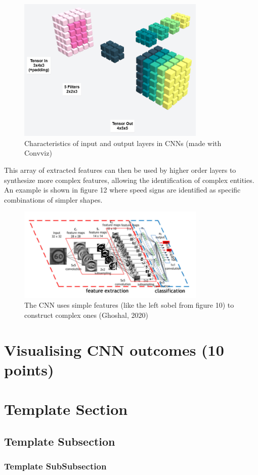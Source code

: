 \documentclass{article}
\begin{document}
\begin{figure}[h!]
    \centering
    \includegraphics[width=0.8\textwidth]{./plots/screenshot7.png}
    \caption{Characteristics of input and output layers in CNNs (made with Convviz)}
    \label{fig:plot13}
\end{figure}

This array of extracted features can then be used by higher order layers to synthesize more complex features, allowing the identification of complex entities.
An example is shown in figure 12 where speed signs are identified as specific combinations of simpler shapes.

\begin{figure}[h!]
    \centering
    \includegraphics[width=0.8\textwidth]{./plots/screenshot6.png}
    \caption{The CNN uses simple features (like the left sobel from figure 10) to construct complex ones (Ghoshal, 2020)}
    \label{fig:plot14}
\end{figure}



\section{Visualising CNN outcomes (10 points)}


\section{Template Section}
\subsection{Template Subsection}
\subsubsection{Template SubSubsection}
\end{document}
